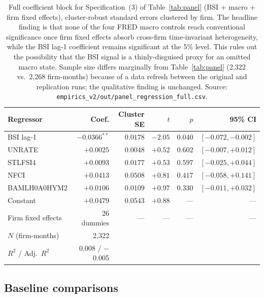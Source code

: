 \documentclass[11pt,a4paper]{article}
\begin{document}
\begin{table}[h]
\centering\small
\begin{tabular}{@{}lrrrrr@{}}
\toprule
\textbf{Regressor} & \textbf{Coef.} & \textbf{Cluster SE} & \textbf{$t$} & \textbf{$p$} & \textbf{95\% CI} \\
\midrule
BSI lag-1                  & $-0.0366^{**}$ & $0.0178$ & $-2.05$ & $0.040$ & $[-0.072, -0.002]$ \\
UNRATE                     & $+0.0025$      & $0.0048$ & $+0.52$ & $0.602$ & $[-0.007, +0.012]$ \\
STLFSI4                    & $+0.0093$      & $0.0177$ & $+0.53$ & $0.597$ & $[-0.025, +0.044]$ \\
NFCI                       & $+0.0413$      & $0.0508$ & $+0.81$ & $0.417$ & $[-0.058, +0.141]$ \\
BAMLH0A0HYM2               & $+0.0106$      & $0.0109$ & $+0.97$ & $0.330$ & $[-0.011, +0.032]$ \\
\midrule
Constant                   & $+0.0479$      & $0.0543$ & $+0.88$ & ---     & --- \\
Firm fixed effects         & 26 dummies     & ---      & ---     & ---     & --- \\
$N$ (firm-months)          & 2{,}322        &          &         &         &     \\
$R^2$ / Adj.\ $R^2$        & 0.008 / $-$0.005 &        &         &         &     \\
\bottomrule
\end{tabular}
\caption{Full coefficient block for Specification~(3) of Table~\ref{tab:panel} (BSI + macro + firm fixed effects), cluster-robust standard errors clustered by firm. The headline finding is that none of the four FRED macro controls reach conventional significance once firm fixed effects absorb cross-firm time-invariant heterogeneity, while the BSI lag-1 coefficient remains significant at the 5\% level. This rules out the possibility that the BSI signal is a thinly-disguised proxy for an omitted macro state. Sample size differs marginally from Table~\ref{tab:panel} (2{,}322 vs.\ 2{,}268 firm-months) because of a data refresh between the original and replication runs; the qualitative finding is unchanged. Source: \texttt{empirics\_v2/out/panel\_regression\_full.csv}.}\label{tab:panel_full}
\end{table}

\subsection{Baseline comparisons}\label{sec:results_baseline}
\end{document}
